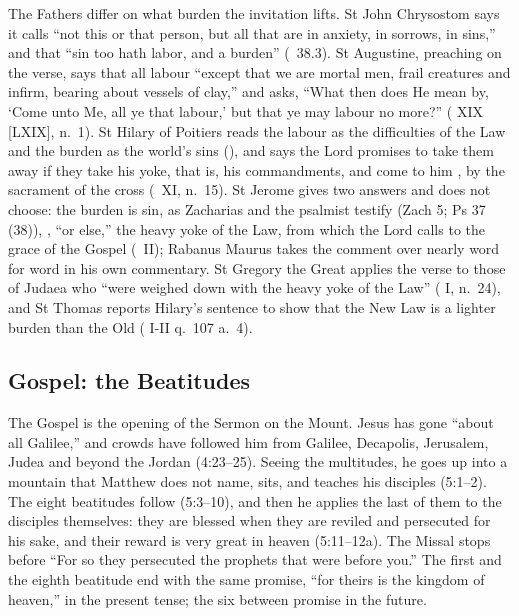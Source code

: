 The Fathers differ on what burden the invitation lifts. St John Chrysostom
says it calls ``not this or that person, but all that are in anxiety, in
sorrows, in sins,'' and that ``sin too hath labor, and a burden''
(\ 38.3). St Augustine, preaching on the verse, says that
all labour ``except that we are mortal men, frail creatures and infirm,
bearing about vessels of clay,'' and asks, ``What then does He mean by, `Come
unto Me, all ye that labour,' but that ye may labour no more?'' (
XIX [LXIX], n.~1). St Hilary of Poitiers reads the labour as the difficulties
of the Law and the burden as the world's sins
(), and says the Lord promises to take them away if they take his
yoke, that is, his commandments, and come to him ,
by the sacrament of the cross (\ XI, n.~15). St Jerome gives
two answers and does not choose: the burden is sin, as Zacharias and the
psalmist testify (Zach 5; Ps 37 (38)), , ``or else,'' the
heavy yoke of the Law, from which the Lord calls to the grace of the Gospel
(\ II); Rabanus Maurus takes the comment over nearly word for
word in his own commentary. St Gregory the Great applies the verse to those of
Judaea who ``were weighed down with the heavy yoke of the Law'' (
I, n.~24), and St Thomas reports Hilary's sentence to show that the New Law is
a lighter burden than the Old ( I-II q.~107 a.~4).

\subsection{Gospel: the Beatitudes}
\label{sec:element-gospel}

The Gospel is the opening of the Sermon on the Mount. Jesus has gone ``about
all Galilee,'' and crowds have followed him from Galilee, Decapolis,
Jerusalem, Judea and beyond the Jordan (4:23--25). Seeing the multitudes, he
goes up into a mountain that Matthew does not name, sits, and teaches his
disciples (5:1--2). The eight beatitudes follow (5:3--10), and then he applies
the last of them to the disciples themselves: they are blessed when they are
reviled and persecuted for his sake, and their reward is very great in heaven
(5:11--12a). The Missal stops before ``For so they persecuted the prophets
that were before you.'' The first and the eighth beatitude end with the same
promise, ``for theirs is the kingdom of heaven,'' in the present tense; the six
between promise in the future.

